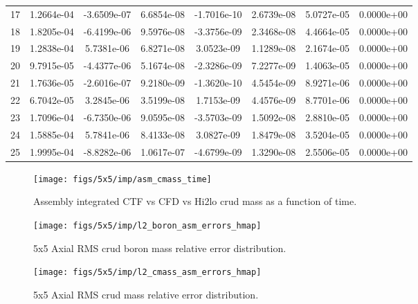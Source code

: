 \begin{table}[h]
\begin{center}
\begin{tabular}[h]{|c|c|c|c|c|c|c|c|}
17  & 1.2664e-04 & -3.6509e-07 & 6.6854e-08 & -1.7016e-10 & 2.6739e-08 & 5.0727e-05 & 0.0000e+00 \\ 
18  & 1.8205e-04 & -6.4199e-06 & 9.5976e-08 & -3.3756e-09 & 2.3468e-08 & 4.4664e-05 & 0.0000e+00 \\ 
19  & 1.2838e-04 & 5.7381e-06 & 6.8271e-08 & 3.0523e-09 & 1.1289e-08 & 2.1674e-05 & 0.0000e+00 \\ 
20  & 9.7915e-05 & -4.4377e-06 & 5.1674e-08 & -2.3286e-09 & 7.2277e-09 & 1.4063e-05 & 0.0000e+00 \\ 
21  & 1.7636e-05 & -2.6016e-07 & 9.2180e-09 & -1.3620e-10 & 4.5454e-09 & 8.9271e-06 & 0.0000e+00 \\ 
22  & 6.7042e-05 & 3.2845e-06 & 3.5199e-08 & 1.7153e-09 & 4.4576e-09 & 8.7701e-06 & 0.0000e+00 \\ 
23  & 1.7096e-04 & -6.7350e-06 & 9.0595e-08 & -3.5703e-09 & 1.5092e-08 & 2.8810e-05 & 0.0000e+00 \\ 
24  & 1.5885e-04 & 5.7841e-06 & 8.4133e-08 & 3.0827e-09 & 1.8479e-08 & 3.5204e-05 & 0.0000e+00 \\ 
25  & 1.9995e-04 & -8.8282e-06 & 1.0617e-07 & -4.6799e-09 & 1.3290e-08 & 2.5506e-05 & 0.0000e+00 \\ 
\hline
\end{tabular}
\label{tab:loo_rms}
\end{center}
\end{table}

\begin{figure}[H]
    \centering
    \texttt{[image: figs/5x5/imp/asm\_cmass\_time]}
    \caption{Assembly integrated CTF vs CFD vs Hi2lo crud mass as a function of time.}
    \label{fig:asmcmasstime}
\end{figure}

\begin{figure}[H]
    \centering
    \texttt{[image: figs/5x5/imp/l2\_boron\_asm\_errors\_hmap]}
    \caption{5x5 Axial RMS crud boron mass relative error distribution.}
    \label{fig:l2boronasmerrorshmap}
\end{figure}
\begin{figure}[H]
    \centering
    \texttt{[image: figs/5x5/imp/l2\_cmass\_asm\_errors\_hmap]}
    \caption{5x5 Axial RMS crud mass relative error distribution.}
    \label{fig:l2cmassasmerrorshmap}
\end{figure}


